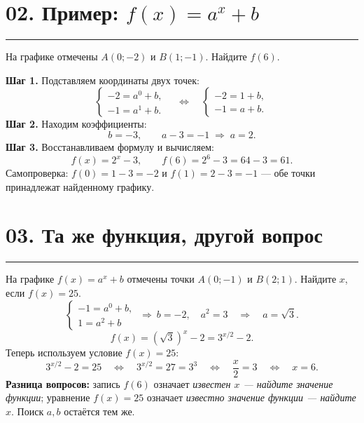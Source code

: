 \documentclass[a4paper,12pt]{article}
\newcommand{\sectionline}{\par\vspace{-3pt}\noindent\textcolor{accent}{\rule{\linewidth}{0.5pt}}\par\vspace{2pt}}
\begin{document}
\section*{02. Пример: \(f(x)=a^x+b\)}
\sectionline
На графике отмечены $A(0;-2)$ и $B(1;-1)$. Найдите $f(6)$.
\begin{center}
\end{center}
\textbf{Шаг 1.} Подставляем координаты двух точек:
\[
\begin{cases}
-2=a^0+b,\\
-1=a^1+b.
\end{cases}
\quad\Longleftrightarrow\quad
\begin{cases}
-2=1+b,\\
-1=a+b.
\end{cases}
\]
\textbf{Шаг 2.} Находим коэффициенты:
\[
 b=-3,\qquad a-3=-1\;\Longrightarrow\;a=2.
\]
\textbf{Шаг 3.} Восстанавливаем формулу и вычисляем:
\[
 f(x)=2^x-3,\qquad f(6)=2^6-3=64-3=\boxed{61}.
\]
\textcolor{muted}{Самопроверка: $f(0)=1-3=-2$ и $f(1)=2-3=-1$ --- обе точки принадлежат найденному графику.}

\clearpage
\section*{03. Та же функция, другой вопрос}
\sectionline
На графике $f(x)=a^x+b$ отмечены точки $A(0;-1)$ и $B(2;1)$. Найдите $x$, если $f(x)=25$.
\[
\begin{cases}
-1=a^0+b,\\ 1=a^2+b
\end{cases}
\ \Longrightarrow\ b=-2,\quad a^2=3\quad\Longrightarrow\quad a=\sqrt3.
\]
\[
 f(x)=(\sqrt3)^x-2=3^{x/2}-2.
\]
Теперь используем условие $f(x)=25$:
\[
 3^{x/2}-2=25\quad\Longleftrightarrow\quad 3^{x/2}=27=3^3
 \quad\Longleftrightarrow\quad \frac{x}{2}=3
 \quad\Longleftrightarrow\quad \boxed{x=6}.
\]
\textbf{Разница вопросов:} запись $f(6)$ означает \emph{известен $x$ --- найдите значение функции}; уравнение $f(x)=25$ означает \emph{известно значение функции --- найдите $x$}. Поиск $a,b$ остаётся тем же.
\end{document}
